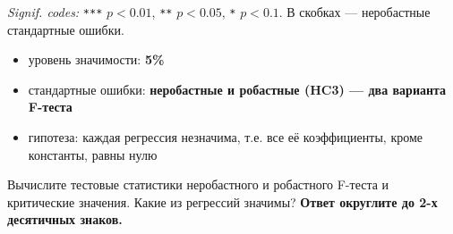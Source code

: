\documentclass[
  russian,
]{article}
\providecommand{\tightlist}{%
  \setlength{\itemsep}{0pt}\setlength{\parskip}{0pt}}
\begin{document}
\emph{Signif. codes:} \texttt{***} \(p<0.01\), \texttt{**} \(p<0.05\),
\texttt{*} \(p<0.1\). В скобках --- неробастные стандартные ошибки.

\begin{tcolorbox}[enhanced jigsaw, arc=.35mm, bottomrule=.15mm, bottomtitle=1mm, breakable, colback=white, colbacktitle=quarto-callout-important-color!10!white, colframe=quarto-callout-important-color-frame, coltitle=black, left=2mm, leftrule=.75mm, opacityback=0, opacitybacktitle=0.6, rightrule=.15mm, title=\textcolor{quarto-callout-important-color}{\faExclamation}\hspace{0.5em}{Условия теста}, titlerule=0mm, toprule=.15mm, toptitle=1mm]

\begin{itemize}
\tightlist
\item
  уровень значимости: \textbf{5\%}
\item
  стандартные ошибки: \textbf{неробастные и робастные (HC3) --- два
  варианта F-теста}
\item
  гипотеза: каждая регрессия незначима, т.е. все её коэффициенты, кроме
  константы, равны нулю
\end{itemize}

\end{tcolorbox}

Вычислите тестовые статистики неробастного и робастного F-теста и
критические значения. Какие из регрессий значимы? \textbf{Ответ
округлите до 2-х десятичных знаков.}
\end{document}
